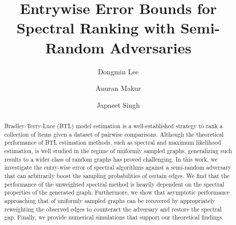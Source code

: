 \documentclass[sigconf,nonacm,pbalance]{acmart}
\begin{document}
\title{Entrywise Error Bounds for Spectral Ranking with Semi-Random Adversaries}

\author{Dongmin Lee}
\author{Anuran Makur}
\author{Japneet Singh}

\renewcommand{\shortauthors}{Lee, Makur, and Singh}

\begin{abstract}
Bradley-Terry-Luce (BTL) model estimation is a well-established strategy to rank a collection of items given a dataset of pairwise comparisons. Although the theoretical performance of BTL estimation methods, such as spectral and maximum likelihood estimation, is well studied in the regime of uniformly sampled graphs, generalizing such results to a wider class of random graphs has proved challenging. In this work, we investigate the entry-wise error of spectral algorithms against a semi-random adversary that can arbitrarily boost the sampling probabilities of certain edges. We find that the performance of the unweighted spectral method is heavily dependent on the spectral properties of the generated graph. Furthermore, we show that asymptotic performance approaching that of uniformly sampled graphs can be recovered by appropriately reweighting the observed edges to counteract the adversary and restore the spectral gap. Finally, we provide numerical simulations that support our theoretical findings.
\end{abstract}



\maketitle
\end{document}
